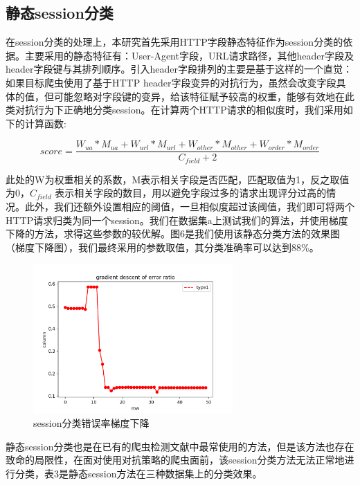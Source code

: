 \documentclass[doctor,privacy,twoside]{buaa_mac}
\begin{document}
\subsection{静态session分类}
在session分类的处理上，本研究首先采用HTTP字段静态特征作为session分类的依据。主要采用的静态特征有：User-Agent字段，URL请求路径，其他header字段及header字段键与其排列顺序。引入header字段排列的主要是基于这样的一个直觉：如果目标爬虫使用了基于HTTP header字段变异的对抗行为，虽然会改变字段具体的值，但可能忽略对字段键的变异，给该特征赋予较高的权重，能够有效地在此类对抗行为下正确地分类session。在计算两个HTTP请求的相似度时，我们采用如下的计算函数:

\begin{equation}
score = \frac {W_{ua} * M_{ua} + W_{url} * M_{url} + W_{other} * M_{other} + W_{order} * M_{order}} {C_{field} + 2}
\end{equation}


此处的W为权重相关的系数，M表示相关字段是否匹配，匹配取值为1，反之取值为0，$C_{field}$ 表示相关字段的数目，用以避免字段过多的请求出现评分过高的情况。此外，我们还额外设置相应的阈值，一旦相似度超过该阈值，我们即可将两个HTTP请求归类为同一个session。我们在数据集a上测试我们的算法，并使用梯度下降的方法，求得这些参数的较优解。图6是我们使用该静态分类方法的效果图（梯度下降图），我们最终采用的参数取值，其分类准确率可以达到88\%。

\centerline{}
\begin{figure}[!h]
  \centering
  \includegraphics[width=0.68\textwidth]{images/gradient_descent.png}
  \caption{session分类错误率梯度下降}
  \label{fig:logo}
\end{figure}
\centerline{}

静态session分类也是在已有的爬虫检测文献中最常使用的方法，但是该方法也存在致命的局限性，在面对使用对抗策略的爬虫面前，该session分类方法无法正常地进行分类，表3是静态session方法在三种数据集上的分类效果。
\end{document}
